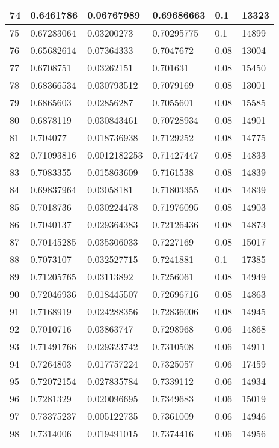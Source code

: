 \begin{longtable}{|l|l|l|l|l|l|}
74 & 0.6461786 & 0.06767989 & 0.69686663 & 0.1 & 13323 \\ \hline 
75 & 0.67283064 & 0.03200273 & 0.70295775 & 0.1 & 14899 \\ \hline 
76 & 0.65682614 & 0.07364333 & 0.7047672 & 0.08 & 13004 \\ \hline 
77 & 0.6708751 & 0.03262151 & 0.701631 & 0.08 & 15450 \\ \hline 
78 & 0.68366534 & 0.030793512 & 0.7079169 & 0.08 & 13001 \\ \hline 
79 & 0.6865603 & 0.02856287 & 0.7055601 & 0.08 & 15585 \\ \hline 
80 & 0.6878119 & 0.030843461 & 0.70728934 & 0.08 & 14901 \\ \hline 
81 & 0.704077 & 0.018736938 & 0.7129252 & 0.08 & 14775 \\ \hline 
82 & 0.71093816 & 0.0012182253 & 0.71427447 & 0.08 & 14833 \\ \hline 
83 & 0.7083355 & 0.015863609 & 0.7161538 & 0.08 & 14839 \\ \hline 
84 & 0.69837964 & 0.03058181 & 0.71803355 & 0.08 & 14839 \\ \hline 
85 & 0.7018736 & 0.030224478 & 0.71976095 & 0.08 & 14903 \\ \hline 
86 & 0.7040137 & 0.029364383 & 0.72126436 & 0.08 & 14873 \\ \hline 
87 & 0.70145285 & 0.035306033 & 0.7227169 & 0.08 & 15017 \\ \hline 
88 & 0.7073107 & 0.032527715 & 0.7241881 & 0.1 & 17385 \\ \hline 
89 & 0.71205765 & 0.03113892 & 0.7256061 & 0.08 & 14949 \\ \hline 
90 & 0.72046936 & 0.018445507 & 0.72696716 & 0.08 & 14863 \\ \hline 
91 & 0.7168919 & 0.024288356 & 0.72836006 & 0.08 & 14945 \\ \hline 
92 & 0.7010716 & 0.03863747 & 0.7298968 & 0.06 & 14868 \\ \hline 
93 & 0.71491766 & 0.029323742 & 0.7310508 & 0.06 & 14911 \\ \hline 
94 & 0.7264803 & 0.017757224 & 0.7325057 & 0.06 & 17459 \\ \hline 
95 & 0.72072154 & 0.027835784 & 0.7339112 & 0.06 & 14934 \\ \hline 
96 & 0.7281329 & 0.020096695 & 0.7349683 & 0.06 & 15019 \\ \hline 
97 & 0.73375237 & 0.005122735 & 0.7361009 & 0.06 & 14946 \\ \hline 
98 & 0.7314006 & 0.019491015 & 0.7374416 & 0.06 & 14956 \\ \hline 

\end{longtable}
